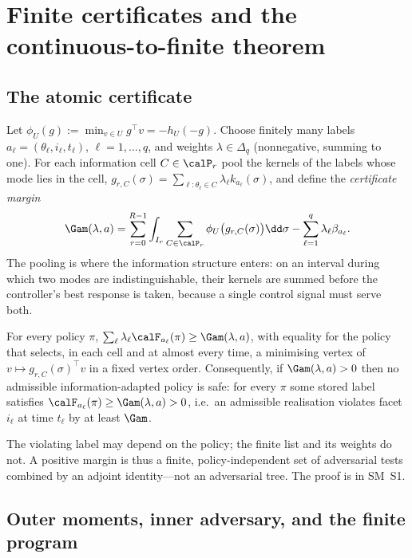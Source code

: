 \section{Finite certificates and the continuous-to-finite theorem}\label{sec:certificates}

\subsection{The atomic certificate}

Let $\phi_U(g):=\min_{v\in U}g^\top v=-h_U(-g)$. Choose finitely many labels $a_\ell=(\theta_\ell,i_\ell,t_\ell)$, $\ell=1,\dots,q$, and weights $\lambda\in\Delta_q$ (nonnegative, summing to one). For each information cell $C\in\calP_r$ pool the kernels of the labels whose mode lies in the cell, $g_{r,C}(\sigma)=\sum_{\ell:\theta_\ell\in C}\lambda_\ell k_{a_\ell}(\sigma)$, and define the \emph{certificate margin}
\begin{equation}\label{eq:margin}
\Gam(\lambda,a)=\sum_{r=0}^{R-1}\int_{I_r}\sum_{C\in\calP_r}\phi_U\bigl(g_{r,C}(\sigma)\bigr)\dd\sigma-\sum_{\ell=1}^q\lambda_\ell\beta_{a_\ell}.
\end{equation}
The pooling is where the information structure enters: on an interval during which two modes are indistinguishable, their kernels are summed before the controller's best response is taken, because a single control signal must serve both.

\begin{lemma}\label{lem:semantics}
For every policy $\pi$, $\sum_\ell\lambda_\ell\calF_{a_\ell}(\pi)\ge\Gam(\lambda,a)$, with equality for the policy that selects, in each cell and at almost every time, a minimising vertex of $v\mapsto g_{r,C}(\sigma)^\top v$ in a fixed vertex order. Consequently, if $\Gam(\lambda,a)>0$ then no admissible information-adapted policy is safe: for every $\pi$ some stored label satisfies $\calF_{a_\ell}(\pi)\ge\Gam(\lambda,a)>0$, i.e.\ an admissible realisation violates facet $i_\ell$ at time $t_\ell$ by at least $\Gam$.
\end{lemma}

The violating label may depend on the policy; the finite list and its weights do not. A positive margin is thus a finite, policy-independent set of adversarial tests combined by an adjoint identity---not an adversarial tree. The proof is in SM~S1.

\subsection{Outer moments, inner adversary, and the finite program}

